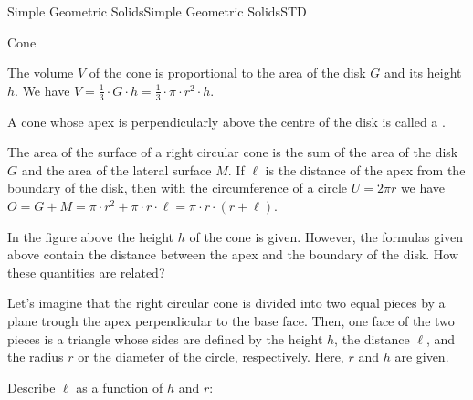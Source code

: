 \begin{MXContent}{Simple Geometric Solids}{Simple Geometric Solids}{STD}
\begin{MXInfo}{Cone}
\begin{center}
{
}
\end{center}

The volume $V$ of the cone is proportional to the area of the disk $G$ and 
its height $h$. We have $V = \frac{1}{3} \cdot G \cdot h %
 = \frac{1}{3} \cdot \pi \cdot r^2 \cdot h$.

A cone whose apex is perpendicularly above the centre of the disk is called a 
.

The area of the surface of a right circular cone is the sum of the 
area of the disk $G$ and the area of the lateral surface $M$. If $\ell$
is the distance of the apex from the boundary of the disk, then with the 
circumference of a circle $U =  2 \pi r$ we have
$O = G + M = \pi \cdot r^2 + \pi \cdot r \cdot \ell %
 = \pi \cdot r \cdot (r + \ell)$.
\end{MXInfo}

In the figure above the height $h$ of the cone is given. However, 
the formulas given above contain the distance between the apex and 
the boundary of the disk. How these quantities are related?

\begin{MExercise}
Let's imagine that the right circular cone is divided into two equal pieces by a plane 
trough the apex perpendicular to the base face. Then, one face of the two pieces is a triangle
whose sides are defined by the height $h$, the distance $\ell$, and the radius $r$ or the diameter of 
the circle, respectively. Here, $r$ and $h$ are given.

\begin{MExerciseItems}
\item
Describe $\ell$ as a function of $h$ and $r$:
\par
{}


\end{MExerciseItems}
\end{MExercise}
\end{MXContent}
